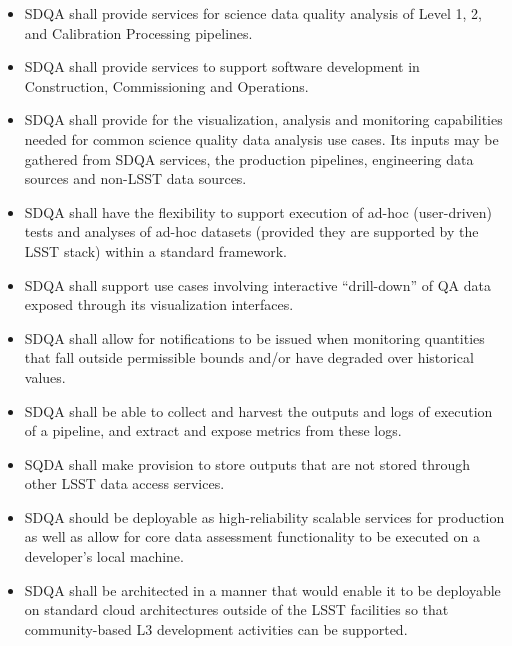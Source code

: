 \begin{itemize}
\item SDQA shall provide services for science data quality analysis of Level 1, 2, and Calibration Processing pipelines.

\item SDQA shall provide services to support software development in Construction, Commissioning and Operations.

\item SDQA shall provide for the visualization, analysis and monitoring capabilities needed for common science quality data analysis use cases. Its inputs may be gathered from SDQA services, the production pipelines, engineering data sources and non-LSST data sources.

\item SDQA shall have the flexibility to support execution of ad-hoc (user-driven) tests and analyses of ad-hoc datasets (provided they are supported by the LSST stack) within a standard framework.

\item SDQA shall support use cases involving interactive ``drill-down'' of QA data exposed through its visualization interfaces.

\item SDQA shall allow for notifications to be issued when monitoring quantities that fall outside permissible bounds and/or have degraded over historical values.

\item SDQA shall be able to collect and harvest the outputs and logs of execution of a pipeline, and extract and expose metrics from these logs.

\item SQDA shall make provision to store outputs that are not stored through other LSST data access services.

\item SDQA should be deployable as high-reliability scalable services for production as well as allow for core data assessment functionality to be executed on a developer's local machine.

\item SDQA shall be architected in a manner that would enable it to be deployable on standard cloud architectures outside of the LSST facilities so that community-based L3 development activities can be supported.

\end{itemize}

